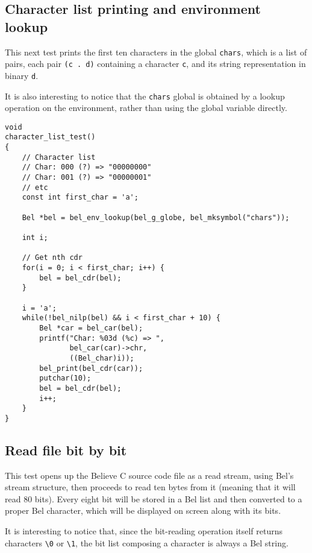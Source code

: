 \documentclass[openright,a4paper,twoside,12pt]{memoir}
\begin{document}
\subsection{Character list printing and environment lookup}
\label{sec:orga4fdc41}

This next test prints the first ten characters in the global \texttt{chars},
which is a list of pairs, each pair \texttt{(c . d)} containing a character \texttt{c},
and its string representation in binary \texttt{d}.

It is also interesting to notice that the \texttt{chars} global is obtained by
a lookup operation on the environment, rather than using the global
variable directly.

\begin{verbatim}
void
character_list_test()
{
    // Character list
    // Char: 000 (?) => "00000000"
    // Char: 001 (?) => "00000001"
    // etc
    const int first_char = 'a';
    
    Bel *bel = bel_env_lookup(bel_g_globe, bel_mksymbol("chars"));
    
    int i;

    // Get nth cdr
    for(i = 0; i < first_char; i++) {
        bel = bel_cdr(bel);
    }

    i = 'a';
    while(!bel_nilp(bel) && i < first_char + 10) {
        Bel *car = bel_car(bel);
        printf("Char: %03d (%c) => ",
               bel_car(car)->chr,
               ((Bel_char)i));
        bel_print(bel_cdr(car));
        putchar(10);
        bel = bel_cdr(bel);
        i++;
    }
}
\end{verbatim}

\subsection{Read file bit by bit}
\label{sec:orgad944d9}

This test opens up the Believe C source code file as a read stream,
using Bel's stream structure, then proceeds to read ten bytes from it
(meaning that it will read 80 bits). Every eight bit will be stored in
a Bel list and then converted to a proper Bel character, which will be
displayed on screen along with its bits.

It is interesting to notice that, since the bit-reading operation
itself returns characters \texttt{\textbackslash{}0} or \texttt{\textbackslash{}1}, the bit list composing a character
is always a Bel string.
\end{document}
